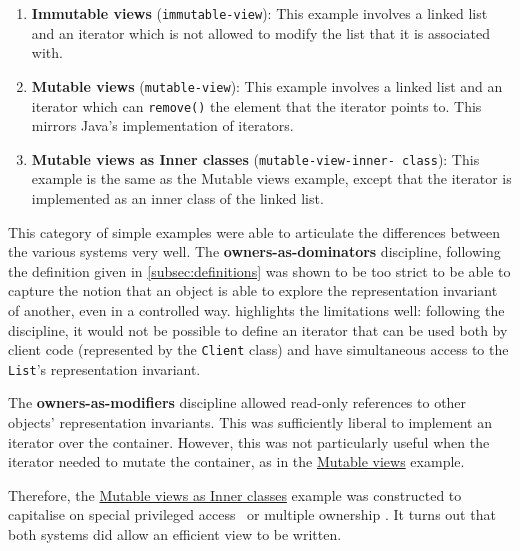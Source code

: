 \documentclass{acm_proc_article-sp}
\begin{document}
\begin{enumerate}
	\item \textbf{Immutable views} (\texttt{immutable-view}): This example
		involves a linked list and an iterator which is not allowed to modify
		the list that it is associated with.

	\item \label{item:mutable-views} \textbf{Mutable views}
		(\texttt{mutable-view}): This example involves a linked list and an
		iterator which can \lstinline|remove()| the element that the iterator
		points to. This mirrors Java's implementation of iterators.

	\item \label{item:mutable-views-as-inner-classes} \textbf{Mutable views as
		Inner classes} (\texttt{mutable-view-inner-\linebreak~class}): This
		example is the same as the Mutable views example, except that the
		iterator is implemented as an inner class of the linked list.
\end{enumerate}

This category of simple examples were able to articulate the differences between
the various systems very well. The \textbf{owners-as-dominators} discipline,
following the definition given in \cref{subsec:definitions} was shown to be too
strict to be able to capture the notion that an object is able to explore the
representation invariant of another, even in a controlled way.
 highlights the limitations 
well: following the discipline, it would not be possible to define an iterator
that can be used both by client code (represented by the \lstinline|Client|
class) and have simultaneous access to the \lstinline|List|'s representation
invariant.

The \textbf{owners-as-modifiers} discipline allowed read-only references to
other objects' representation invariants. This was sufficiently liberal to
implement an iterator over the container. However, this was not particularly 
useful when the iterator needed to mutate the container, as in the 
\hyperref[item:mutable-views]{Mutable views} example.

Therefore, the \hyperref[item:mutable-views-as-inner-classes]{Mutable views as
Inner classes} example was constructed to capitalise on special privileged
access~\cite{boyapati04safejava} or multiple ownership \cite{cameron07mojo}. It
turns out that both systems did allow an efficient view to be written.
\end{document}
